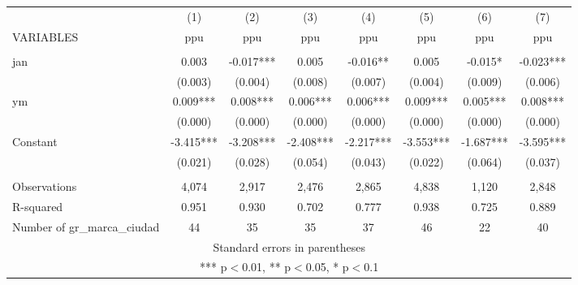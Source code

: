 \begin{tabular}{lccccccc} \hline
 & (1) & (2) & (3) & (4) & (5) & (6) & (7) \\
VARIABLES & ppu & ppu & ppu & ppu & ppu & ppu & ppu \\ \hline
 &  &  &  &  &  &  &  \\
jan & 0.003 & -0.017*** & 0.005 & -0.016** & 0.005 & -0.015* & -0.023*** \\
 & (0.003) & (0.004) & (0.008) & (0.007) & (0.004) & (0.009) & (0.006) \\
ym & 0.009*** & 0.008*** & 0.006*** & 0.006*** & 0.009*** & 0.005*** & 0.008*** \\
 & (0.000) & (0.000) & (0.000) & (0.000) & (0.000) & (0.000) & (0.000) \\
Constant & -3.415*** & -3.208*** & -2.408*** & -2.217*** & -3.553*** & -1.687*** & -3.595*** \\
 & (0.021) & (0.028) & (0.054) & (0.043) & (0.022) & (0.064) & (0.037) \\
 &  &  &  &  &  &  &  \\
Observations & 4,074 & 2,917 & 2,476 & 2,865 & 4,838 & 1,120 & 2,848 \\
R-squared & 0.951 & 0.930 & 0.702 & 0.777 & 0.938 & 0.725 & 0.889 \\
 Number of gr\_marca\_ciudad & 44 & 35 & 35 & 37 & 46 & 22 & 40 \\ \hline
\multicolumn{8}{c}{ Standard errors in parentheses} \\
\multicolumn{8}{c}{ *** p$<$0.01, ** p$<$0.05, * p$<$0.1} \\
\end{tabular}
